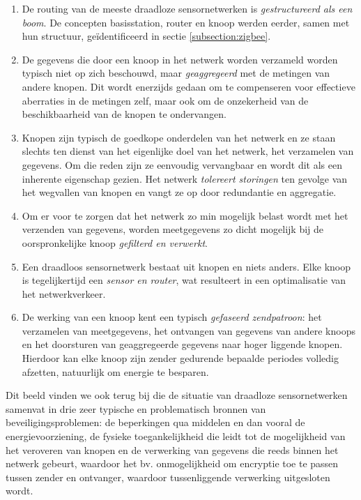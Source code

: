 \begin{enumerate}

\item{De routing van de meeste draadloze sensornetwerken is
\emph{gestructureerd als een boom}. De concepten basisstation, router en knoop
werden eerder, samen met hun structuur, ge\"identificeerd in sectie
\ref{subsection:zigbee}.}

\item{De gegevens die door een knoop in het netwerk worden verzameld worden
typisch niet op zich beschouwd, maar \emph{geaggregeerd} met de metingen van
andere knopen. Dit wordt enerzijds gedaan om te compenseren voor effectieve
aberraties in de metingen zelf, maar ook om de onzekerheid van de
beschikbaarheid van de knopen te ondervangen.}

\item{Knopen zijn typisch de goedkope onderdelen van het netwerk en ze staan
slechts ten dienst van het eigenlijke doel van het netwerk, het verzamelen van
gegevens. Om die reden zijn ze eenvoudig vervangbaar en wordt dit als een
inherente eigenschap gezien. Het netwerk \emph{tolereert storingen} ten gevolge
van het wegvallen van knopen en vangt ze op door redundantie en aggregatie.}

\item{Om er voor te zorgen dat het netwerk zo min mogelijk belast wordt met het
verzenden van gegevens, worden meetgegevens zo dicht mogelijk bij de
oorspronkelijke knoop \emph{gefilterd en verwerkt}.}

\item{Een draadloos sensornetwerk bestaat uit knopen en niets anders. Elke
knoop is tegelijkertijd een \emph{sensor en router}, wat resulteert in een
optimalisatie van het netwerkverkeer.}

\item{De werking van een knoop kent een typisch \emph{gefaseerd zendpatroon}:
het verzamelen van meetgegevens, het ontvangen van gegevens van andere knoops en
het doorsturen van geaggregeerde gegevens naar hoger liggende knopen. Hierdoor
kan elke knoop zijn zender gedurende bepaalde periodes volledig afzetten,
natuurlijk om energie te besparen.}

\end{enumerate}

Dit beeld vinden we ook terug bij \cite{aschenbruck2012security} die de
situatie van draadloze sensornetwerken samenvat in drie zeer typische en
problematisch bronnen van beveiligingsproblemen: de beperkingen qua middelen en
dan vooral de energievoorziening, de fysieke toegankelijkheid die leidt tot de
mogelijkheid van het veroveren van knopen en de verwerking van gegevens die
reeds binnen het netwerk gebeurt, waardoor het bv. onmogelijkheid om encryptie
toe te passen tussen zender en ontvanger, waardoor tussenliggende verwerking
uitgesloten wordt.

